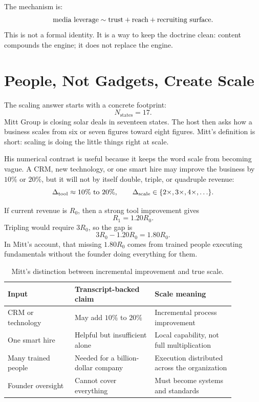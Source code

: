 \documentclass[11pt,oneside]{book}
\begin{document}
The mechanism is:
\[
\hbox{media leverage}
\sim
\hbox{trust}
+
\hbox{reach}
+
\hbox{recruiting surface}.
\]
This is not a formal identity. It is a way to keep the doctrine clean: content compounds the engine; it does not replace the engine.

\section{People, Not Gadgets, Create Scale}

The scaling answer starts with a concrete footprint:
\[
N_{\mathrm{states}}=17.
\]
Mitt Group is closing solar deals in seventeen states. The host then asks how a business scales from six or seven figures toward eight figures. Mitt's definition is short: scaling is doing the little things right at scale.

His numerical contrast is useful because it keeps the word scale from becoming vague. A CRM, new technology, or one smart hire may improve the business by \(10\%\) or \(20\%\), but it will not by itself double, triple, or quadruple revenue:
\[
\Delta_{\mathrm{tool}}
\approx
10\%\hbox{ to }20\%,
\qquad
\Delta_{\mathrm{scale}}
\in
\{2\times,3\times,4\times,\ldots\}.
\]

If current revenue is \(R_0\), then a strong tool improvement gives
\[
R_1=1.20R_0.
\]
Tripling would require \(3R_0\), so the gap is
\[
3R_0-1.20R_0=1.80R_0.
\]
In Mitt's account, that missing \(1.80R_0\) comes from trained people executing fundamentals without the founder doing everything for them.

\begin{table}
\centering
\small
\begin{tabular}{p{0.26\linewidth}p{0.31\linewidth}p{0.31\linewidth}}
\hline
Input & Transcript-backed claim & Scale meaning \\
\hline
CRM or technology & May add \(10\%\) to \(20\%\) & Incremental process improvement \\
One smart hire & Helpful but insufficient alone & Local capability, not full multiplication \\
Many trained people & Needed for a billion-dollar company & Execution distributed across the organization \\
Founder oversight & Cannot cover everything & Must become systems and standards \\
\hline
\end{tabular}
\caption{Mitt's distinction between incremental improvement and true scale.}
\end{table}
\end{document}
